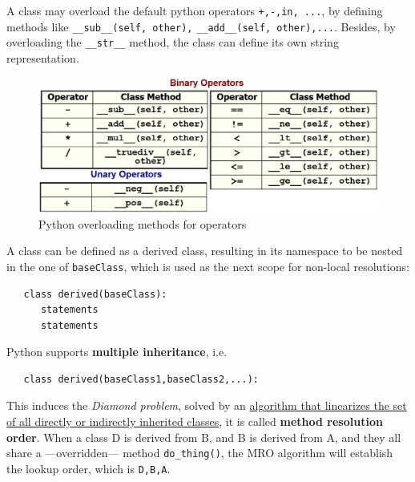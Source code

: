 \begin{paracol}{2}
   A class may overload the default python operators \lstinline|+,-,in, ...|,
   by defining methods like \lstinline|__sub__(self, other),| \lstinline|__add__(self, other),...|.
   Besides, by overloading the \lstinline|__str__| method, the class can define its own string representation.
   \switchcolumn
   \begin{figure}[htbp]
      \centering
      \includegraphics[width=0.9\columnwidth]{images/python_overloading.png}
      \caption{Python overloading methods for operators}
      \label{fig:python_overloading}
   \end{figure}
\end{paracol}


A class can be defined as a derived class, resulting in its namespace to be nested in the one of \lstinline|baseClass|, which is used as the next scope for non-local resolutions:  
\begin{lstlisting}
   class derived(baseClass):
      statements
      statements
\end{lstlisting}
Python supports \textbf{multiple inheritance}, i.e.
\begin{lstlisting}
   class derived(baseClass1,baseClass2,...):
\end{lstlisting}
This induces the \textit{Diamond problem}, solved by an \href{https://www.python.org/download/releases/2.3/mro/}{algorithm that linearizes the set of all directly or indirectly inherited classes}, it is called \textbf{method resolution order}.
When a class D is derived from B, and B is derived from A, and they all share a ---overridden--- method \lstinline|do_thing()|, the MRO algorithm will establish the lookup order, which is \lstinline|D,B,A|.


